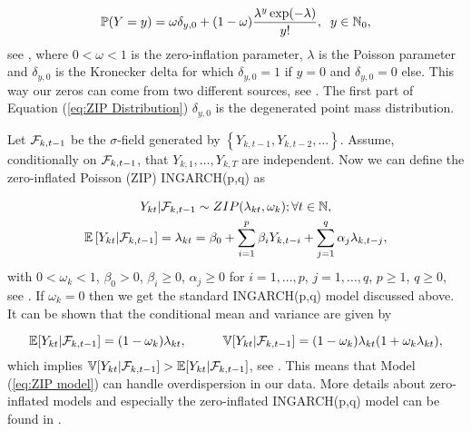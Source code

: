 \begin{equation}
\mathbb{P}(Y=y) = \omega \delta_{y,0}+ (1-\omega) \frac{\lambda^y \exp(-\lambda)}{y!}, \hspace{0.2cm} y \in \mathbb{N}_0,
\label{eq:ZIP Distribution}
\end{equation}
%
see \textcite{Zhu:2012}, where $0 < \omega < 1$ is the zero-inflation parameter, $\lambda$ is the Poisson parameter and $\delta_{y,0}$ is the Kronecker delta for which $\delta_{y,0}=1$ if $y=0$ and $\delta_{y,0}=0$ else. This way our zeros can come from two different sources, see \textcite{Zhu:2012}. The first part of Equation (\ref{eq:ZIP Distribution}) $\delta_{y,0}$ is the degenerated point mass distribution.

Let $\mathcal{F}_{k,t-1}$ be the $\sigma$-field generated by $\left\{Y_{k,t-1},Y_{k,t-2},\ldots\right\}$. Assume, conditionally on $\mathcal{F}_{k,t-1}$, that $Y_{k,1},\ldots,Y_{k,T}$ are independent. Now we can define the zero-inflated Poisson (ZIP) INGARCH(p,q) as

\begin{equation}
\begin{gathered}
\label{eq:ZIP model}
Y_{kt} | \mathcal{F}_{k,t-1} \sim ZIP(\lambda_{kt},\omega_k); \forall t \in \mathbb{N}, \\
\mathbb{E}\left[Y_{kt} | \mathcal{F}_{k,t-1} \right] = \lambda_{kt} = \beta_0 + \sum_{i=1}^p\beta_i Y_{k,t-i} + \sum_{j=1}^q\alpha_j \lambda_{k,t-j},
\end{gathered}
\end{equation}
%
with $0<\omega_k<1$, $\beta_0>0$, $\beta_i\geq 0$, $\alpha_j \geq 0$ for $i=1,\ldots,p$, $j=1,\ldots,q$, $p\geq 1$, $q\geq 0$, see \textcite{Zhu:2012}. If $\omega_k =0$ then we get the standard INGARCH(p,q) model discussed above. It can be shown that the conditional mean and variance are given by

\begin{equation}
\mathbb{E}[Y_{kt} | \mathcal{F}_{k,t-1}] = (1-\omega_k)\lambda_{kt}, \hspace{1cm} \mathbb{V}[Y_{kt} | \mathcal{F}_{k,t-1}] =(1-\omega_k)\lambda_{kt}(1+\omega_k \lambda_{kt}),
\label{eq:Conditional Mean and Variance ZIP}
\end{equation}
%
which implies $ \mathbb{V}[Y_{kt} | \mathcal{F}_{k,t-1}] > \mathbb{E}[Y_{kt} | \mathcal{F}_{k,t-1}]$, see \textcite{Zhu:2012}. This means that Model (\ref{eq:ZIP model}) can handle overdispersion in our data. More details about zero-inflated models and especially the zero-inflated INGARCH(p,q) model can be found in \textcite{Zhu:2012}.

